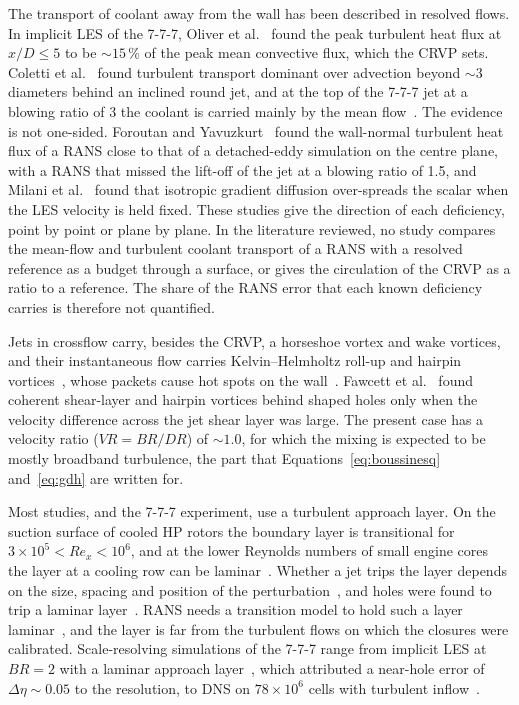 \documentclass[colorlinks,upint,subscriptcorrection,varvw,hyphenate,balance,lineno]{asmeconf}
\newcommand*{\BR}{\mathit{BR}}
\newcommand*{\DR}{\mathit{DR}}
\newcommand*{\VR}{\mathit{VR}}
\begin{document}
The transport of coolant away from the wall has been described in resolved flows. In implicit LES of the 7-7-7,
Oliver et al.~\cite{oliver2017} found the peak turbulent heat flux at $x/D\le5$ to be $\sim15$\,\% of the peak
mean convective flux, which the CRVP sets. Coletti et al.~\cite{coletti2013} found turbulent transport dominant
over advection beyond $\sim3$ diameters behind an inclined round jet, and at the top of the 7-7-7 jet at a
blowing ratio of 3 the coolant is carried mainly by the mean flow~\cite{schroeder2016b}. The evidence is not
one-sided. Foroutan and Yavuzkurt~\cite{foroutan2014} found the wall-normal turbulent heat flux of a RANS close to
that of a detached-eddy simulation on the centre plane, with a RANS that missed the lift-off of the jet at a
blowing ratio of 1.5, and Milani et al.~\cite{milani2020} found that isotropic gradient diffusion over-spreads the
scalar when the LES velocity is held fixed. These studies give the direction of each deficiency, point by point or
plane by plane. In the literature reviewed, no study compares the mean-flow and turbulent coolant transport of a
RANS with a resolved reference as a budget through a surface, or gives the circulation of the CRVP as a
ratio to a reference. The share of the RANS error that each known deficiency carries is therefore not quantified.

Jets in crossflow carry, besides the CRVP, a horseshoe vortex and wake vortices, and their instantaneous flow
carries Kelvin--Helmholtz roll-up and hairpin vortices~\cite{fric1994}, whose packets cause hot spots on the
wall~\cite{tyagi2003}. Fawcett et al.~\cite{fawcett2013} found coherent shear-layer and hairpin vortices behind
shaped holes only when the velocity difference across the jet shear layer was large. The present case has a
velocity ratio ($\VR=\BR/\DR$) of $\sim1.0$, for which the mixing is expected to be mostly broadband turbulence,
the part that Equations~\ref{eq:boussinesq} and~\ref{eq:gdh} are written for.

Most studies, and the 7-7-7 experiment, use a turbulent approach layer. On the suction surface of cooled HP rotors
the boundary layer is transitional for $3\times10^{5}<\mathit{Re}_x<10^{6}$, and at the lower Reynolds numbers of
small engine cores the layer at a cooling row can be laminar~\cite{clark2024}. Whether a jet trips the layer
depends on the size, spacing and position of the perturbation~\cite{kar2026}, and holes were found to trip a
laminar layer~\cite{goldstein1982}. RANS needs a transition model to hold such a layer laminar~\cite{langtry2009},
and the layer is far from the turbulent flows on which the closures were calibrated. Scale-resolving simulations
of the 7-7-7 range from implicit LES at $\BR=2$ with a laminar approach layer~\cite{oliver2017,nunno2022}, which
attributed a near-hole error of $\Delta\eta\sim0.05$ to the resolution, to DNS on $78\times10^{6}$ cells with
turbulent inflow~\cite{bin2024}.
\end{document}
